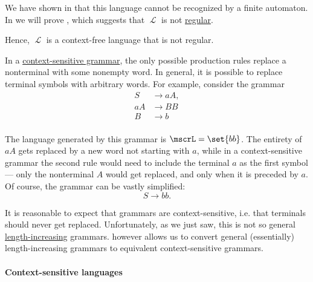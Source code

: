 \begin{example}
\begin{thmenum}
    We have shown in  that this language cannot be recognized by a finite automaton. In  we will prove , which suggests that \( \mscrL \) is not \hyperref[def:chomsky_hierarchy/regular]{regular}.

    Hence, \( \mscrL \) is a context-free language that is not regular.

     In a \hyperref[def:chomsky_hierarchy/context_sensitive]{context-sensitive grammar}, the only possible production rules replace a nonterminal with some nonempty word. In general, it is possible to replace terminal symbols with arbitrary words. For example, consider the grammar
    \begin{equation*}
      \begin{aligned}
         S &\to aA, \\
        aA &\to BB \\
         B &\to b \\
      \end{aligned}
    \end{equation*}

    The language generated by this grammar is \( \mscrL = \set{ bb } \). The entirety of \( aA \) gets replaced by a new word not starting with \( a \), while in a context-sensitive grammar the second rule would need to include the terminal \( a \) as the first symbol --- only the nonterminal \( A \) would get replaced, and only when it is preceded by \( a \). Of course, the grammar can be vastly simplified:
    \begin{equation*}
      S \to bb.
    \end{equation*}

    It is reasonable to expect that grammars are context-sensitive, i.e. that terminals should never get replaced. Unfortunately, as we just saw, this is not so general \hyperref[def:length_increasing_grammar]{length-increasing} grammars.  however allows us to convert general (essentially) length-increasing grammars to equivalent context-sensitive grammars.
  \end{thmenum}
\end{example}

\paragraph{Context-sensitive languages}

